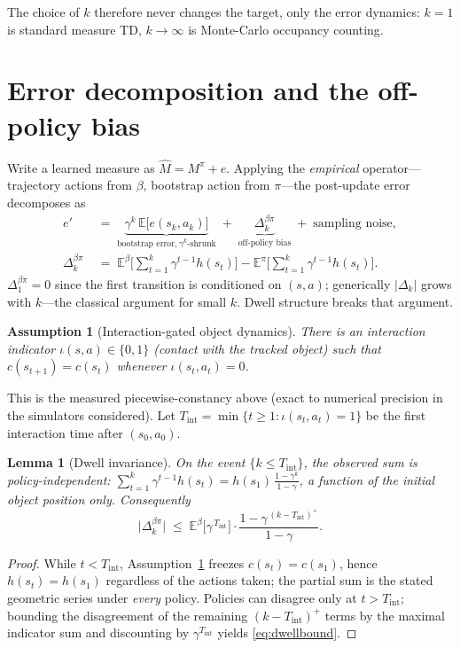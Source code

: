 \documentclass{article}
\newtheorem{lemma}{Lemma}
\newtheorem{assumption}{Assumption}
\newcommand{\M}{M}
\providecommand{\E}{\mathbb{E}}
\begin{document}
The choice of \(k\) therefore never changes the target, only the error
dynamics: \(k{=}1\) is standard measure TD, \(k\to\infty\) is Monte-Carlo
occupancy counting.

\section{Error decomposition and the off-policy bias}

Write a learned measure as \(\widehat{\M}=\M^\pi+e\). Applying the
\emph{empirical} operator---trajectory actions from \(\beta\), bootstrap action
from \(\pi\)---the post-update error decomposes as
\begin{align}
e' \;&=\;
\underbrace{\gamma^{k}\,\E\big[e(s_k,a_k)\big]}_{\text{bootstrap error,}\ \gamma^k\text{-shrunk}}
\;+\;
\underbrace{\Delta_k^{\beta\pi}}_{\text{off-policy bias}}
\;+\;\text{sampling noise},
\label{eq:bias}\\
\Delta_k^{\beta\pi}\;&=\;
\E^{\beta}\!\Big[\sum_{t=1}^{k}\gamma^{t-1}h(s_t)\Big]-
\E^{\pi}\!\Big[\sum_{t=1}^{k}\gamma^{t-1}h(s_t)\Big].\nonumber
\end{align}
\(\Delta_1^{\beta\pi}=0\) since the first transition is conditioned on
\((s,a)\); generically \(|\Delta_k|\) grows with \(k\)---the classical argument
for small \(k\). Dwell structure breaks that argument.

\begin{assumption}[Interaction-gated object dynamics]
\label{ass:contact}
There is an interaction indicator \(\iota(s,a)\in\{0,1\}\) (contact with the
tracked object) such that \(c(s_{t+1})=c(s_t)\) whenever
\(\iota(s_t,a_t)=0\).
\end{assumption}

This is the measured piecewise-constancy above (exact to numerical precision in
the simulators considered). Let
\(T_{\mathrm{int}}=\min\{t\ge1:\iota(s_t,a_t)=1\}\)
be the first interaction time after \((s_0,a_0)\).

\begin{lemma}[Dwell invariance]
\label{lem:dwell}
On the event \(\{k\le T_{\mathrm{int}}\}\), the observed sum is
policy-independent:
\(\sum_{t=1}^{k}\gamma^{t-1}h(s_t)=h(s_1)\,\frac{1-\gamma^{k}}{1-\gamma}\),
a function of the initial object position only. Consequently
\begin{equation}
\big|\Delta_k^{\beta\pi}\big|\;\le\;
\E^{\beta}\Big[\gamma^{\,T_{\mathrm{int}}}\Big]\cdot
\frac{1-\gamma^{\,(k-T_{\mathrm{int}})^+}}{1-\gamma}.
\label{eq:dwellbound}
\end{equation}
\end{lemma}
\begin{proof}
While \(t<T_{\mathrm{int}}\), Assumption~\ref{ass:contact} freezes
\(c(s_t)=c(s_1)\), hence \(h(s_t)=h(s_1)\) regardless of the actions taken;
the partial sum is the stated geometric series under \emph{every} policy.
Policies can disagree only at \(t>T_{\mathrm{int}}\); bounding the disagreement
of the remaining \((k-T_{\mathrm{int}})^+\) terms by the maximal indicator sum
and discounting by \(\gamma^{T_{\mathrm{int}}}\) yields \eqref{eq:dwellbound}.
\end{proof}
\end{document}
